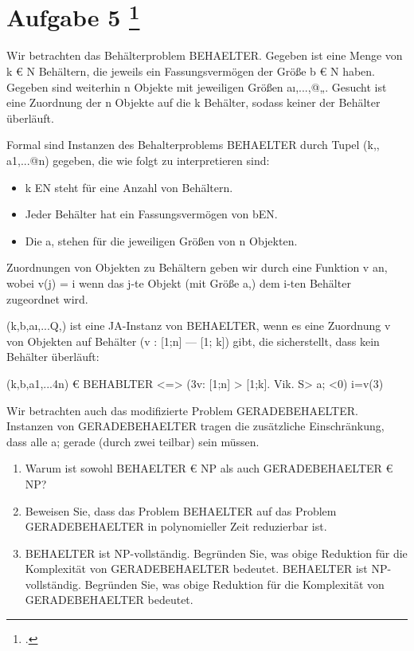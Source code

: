 \documentclass{bschlangaul-aufgabe}
\begin{document}
\section{Aufgabe 5
\footcite{examen:66115:2019:03}}

Wir betrachten das Behälterproblem BEHAELTER. Gegeben ist eine Menge von
k € N Behältern, die jeweils ein Fassungsvermögen der Größe b € N haben.
Gegeben sind weiterhin n Objekte mit jeweiligen Größen aı,...,@„.
Gesucht ist eine Zuordnung der n Objekte auf die k Behälter, sodass
keiner der Behälter überläuft.

Formal sind Instanzen des Behalterproblems BEHAELTER durch Tupel (k,,
a1,...@n) gegeben, die wie folgt zu interpretieren sind:

\begin{itemize}
\item k EN steht für eine Anzahl von Behältern.

\item Jeder Behälter hat ein Fassungsvermögen von bEN.

\item  Die a, stehen für die jeweiligen Größen von n Objekten.
\end{itemize}

Zuordnungen von Objekten zu Behältern geben wir durch eine Funktion v
an, wobei v(j) = i wenn das j-te Objekt (mit Größe a,) dem i-ten
Behälter zugeordnet wird.

(k,b,aı,...Q,) ist eine JA-Instanz von BEHAELTER, wenn es eine Zuordnung
v von Objekten auf Behälter (v : [1;n] — [1; k]) gibt, die sicherstellt,
dass kein Behälter überläuft:

(k,b,a1,...4n) € BEHABLTER <=> (3v: [1;n] > [1;k]. Vik. S> a; <0)
i=v(3)

Wir betrachten auch das modifizierte Problem GERADEBEHAELTER. Instanzen
von GERADEBEHAELTER tragen die zusätzliche Einschränkung, dass alle a;
gerade (durch zwei teilbar) sein müssen.

\begin{enumerate}


\item Warum ist sowohl BEHAELTER € NP als auch GERADEBEHAELTER € NP?


\item Beweisen Sie, dass das Problem BEHAELTER auf das Problem
GERADEBEHAELTER in polynomieller Zeit reduzierbar ist.


\item BEHAELTER ist NP-vollständig. Begründen Sie, was obige Reduktion
für die Komplexität von GERADEBEHAELTER bedeutet. BEHAELTER ist
NP-vollständig. Begründen Sie, was obige Reduktion für die Komplexität
von GERADEBEHAELTER bedeutet.

\end{enumerate}
\end{document}
